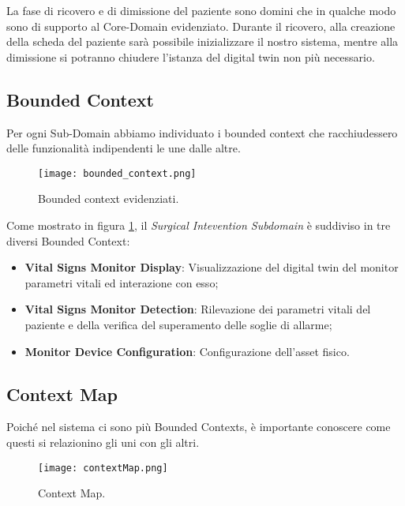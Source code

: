 La fase di ricovero e di dimissione del paziente sono domini che in qualche modo sono di supporto al Core-Domain evidenziato.
\newline Durante il ricovero, alla creazione della scheda del paziente sarà possibile inizializzare il nostro sistema, mentre alla dimissione si potranno chiudere l'istanza del digital twin non più necessario.

\subsection{Bounded Context}

Per ogni Sub-Domain abbiamo individuato i bounded context che racchiudessero delle funzionalità indipendenti le une dalle altre.

\begin{figure}[H]
    \texttt{[image: bounded\_context.png]}
    \centering
    \caption{\label{pic:bounded-context}Bounded context evidenziati.}
\end{figure}

Come mostrato in figura     \ref{pic:bounded-context}, il \textit{Surgical Intevention Subdomain} è suddiviso in tre diversi Bounded Context:

\begin{itemize}
    \item \textbf{Vital Signs Monitor Display}: Visualizzazione del digital twin del monitor parametri vitali ed interazione con esso;
    \item \textbf{Vital Signs Monitor Detection}: Rilevazione dei parametri vitali del paziente e della verifica del superamento delle soglie di allarme;
    \item \textbf{Monitor Device Configuration}: Configurazione dell'asset fisico. 
\end{itemize}

\subsection{Context Map}
Poiché nel sistema ci sono più Bounded Contexts, è importante conoscere come questi si relazionino gli uni con gli altri.

\begin{figure}[H]
    \texttt{[image: contextMap.png]}
    \centering
    \caption{\label{pic:context-map}Context Map.}
\end{figure}


